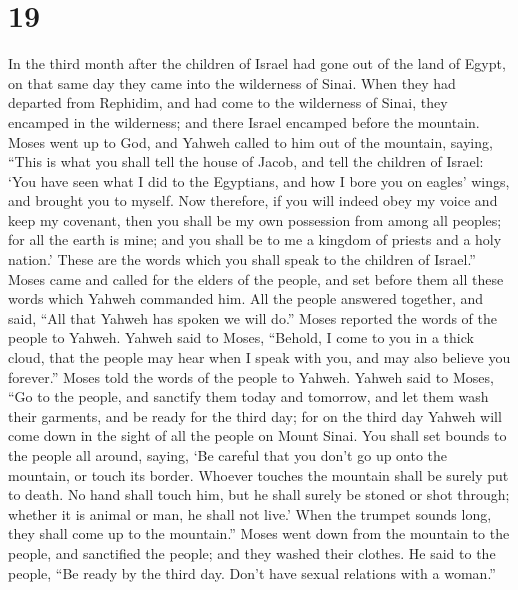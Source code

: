 \hypertarget{section-18}{%
\section{19}\label{section-18}}

 In the third month after the children of Israel had gone
out of the land of Egypt, on that same day they came into the wilderness
of Sinai.  When they had departed from Rephidim, and had
come to the wilderness of Sinai, they encamped in the wilderness; and
there Israel encamped before the mountain.  Moses went up
to God, and Yahweh called to him out of the mountain, saying, ``This is
what you shall tell the house of Jacob, and tell the children of Israel:
 `You have seen what I did to the Egyptians, and how I
bore you on eagles' wings, and brought you to myself.  Now
therefore, if you will indeed obey my voice and keep my covenant, then
you shall be my own possession from among all peoples; for all the earth
is mine;  and you shall be to me a kingdom of priests and
a holy nation.' These are the words which you shall speak to the
children of Israel.''  Moses came and called for the
elders of the people, and set before them all these words which Yahweh
commanded him.  All the people answered together, and
said, ``All that Yahweh has spoken we will do.'' Moses reported the
words of the people to Yahweh.  Yahweh said to Moses,
``Behold, I come to you in a thick cloud, that the people may hear when
I speak with you, and may also believe you forever.'' Moses told the
words of the people to Yahweh.  Yahweh said to Moses,
``Go to the people, and sanctify them today and tomorrow, and let them
wash their garments,  and be ready for the third day; for
on the third day Yahweh will come down in the sight of all the people on
Mount Sinai.  You shall set bounds to the people all
around, saying, `Be careful that you don't go up onto the mountain, or
touch its border. Whoever touches the mountain shall be surely put to
death.  No hand shall touch him, but he shall surely be
stoned or shot through; whether it is animal or man, he shall not live.'
When the trumpet sounds long, they shall come up to the mountain.''
 Moses went down from the mountain to the people, and
sanctified the people; and they washed their clothes.  He
said to the people, ``Be ready by the third day. Don't have sexual
relations with a woman.''

